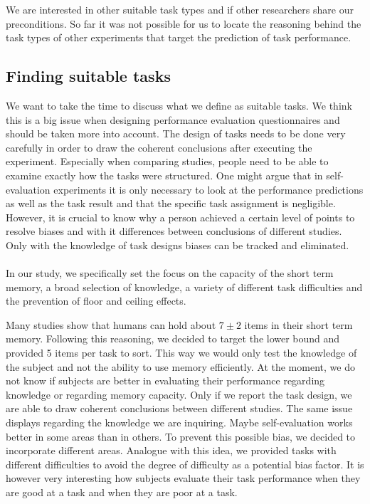 \documentclass[../main/main.tex]{subfiles}
\begin{document}
	We are interested in other suitable task types and if other researchers share our preconditions. So far it was not possible for us to locate the reasoning behind the task types of other experiments that target the prediction of task performance.
	
	\subsection{Finding suitable tasks}
	\label{sec:finding_questions}
	
	We want to take the time to discuss what we define as suitable tasks. We think this is a big issue when designing performance evaluation questionnaires and should be taken more into account. The design of tasks needs to be done very carefully in order to draw the coherent conclusions after executing the experiment. Especially when comparing studies, people need to be able to examine exactly how the tasks were structured. One might argue that in self-evaluation experiments it is only necessary to look at the performance predictions as well as the task result and that the specific task assignment is negligible. However, it is crucial to know why a person achieved a certain level of points to resolve biases and with it differences between conclusions of different studies. Only with the knowledge of task designs biases can be tracked and eliminated.
	\\\\
	In our study, we specifically set the focus on the capacity of the short term memory, a broad selection of knowledge, a variety of different task difficulties and the prevention of floor and ceiling effects.
	
	Many studies show that humans can hold about $7 \pm 2$ items in their short term memory. Following this reasoning, we decided to target the lower bound and provided 5 items per task to sort. This way we would only test the knowledge of the subject and not the ability to use memory efficiently. At the moment, we do not know if subjects are better in evaluating their performance regarding knowledge or regarding memory capacity. Only if we report the task design, we are able to draw coherent conclusions between different studies. The same issue displays regarding the knowledge we are inquiring. Maybe self-evaluation works better in some areas than in others. To prevent this possible bias, we decided to incorporate different areas. Analogue with this idea, we provided tasks with different difficulties to avoid the degree of difficulty as a potential bias factor. It is however very interesting how subjects evaluate their task performance when they are good at a task and when they are poor at a task.
	
\end{document}
